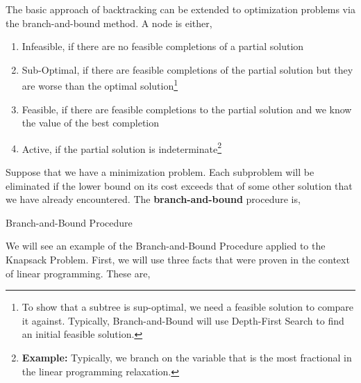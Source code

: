 The basic approach of backtracking can be extended to optimization problems via the branch-and-bound method. A node is either,
\begin{enumerate}
	\item Infeasible, if there are no feasible completions of a partial solution
	\item Sub-Optimal, if there are feasible completions of the partial solution but they are worse than the optimal solution\footnote{To show that a subtree is sup-optimal, we need a feasible solution to compare it against. Typically, Branch-and-Bound will use Depth-First Search to find an initial feasible solution.}
	\item Feasible, if there are feasible completions to the partial solution and we know the value of the best completion
	\item Active, if the partial solution is indeterminate\footnote{\textbf{Example:} Typically, we branch on the variable that is the most fractional in the linear programming relaxation.}
\end{enumerate}

\begin{defn}
	Suppose that we have a minimization problem. Each subproblem will be eliminated if the lower bound on its cost exceeds that of some other solution that we have already encountered. The \textbf{branch-and-bound} procedure is,
 	\begin{algorithm}
	  \caption{Branch-and-Bound Procedure}\label{branchbound}
\end{algorithm}
\end{defn}

We will see an example of the Branch-and-Bound Procedure applied to the Knapsack Problem. First, we will use three facts that were proven in the context of linear programming. These are,

